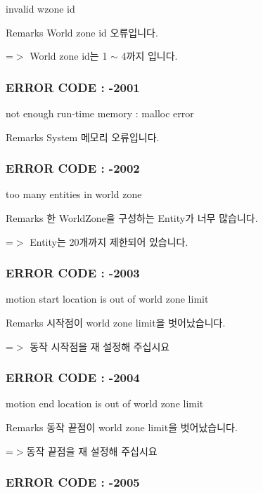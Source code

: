 invalid wzone id \begin{DoxyRemark}{Remarks}
World zone id 오류입니다. \par
 =$>$ World zone id는 1 $\sim$ 4까지 입니다.
\end{DoxyRemark}


 \subsubsection*{E\-R\-R\-O\-R C\-O\-D\-E \-: -\/2001 }

not enough run-\/time memory \-: malloc error \begin{DoxyRemark}{Remarks}
System 메모리 오류입니다.
\end{DoxyRemark}


 \subsubsection*{E\-R\-R\-O\-R C\-O\-D\-E \-: -\/2002 }

too many entities in world zone \begin{DoxyRemark}{Remarks}
한 World\-Zone을 구성하는 Entity가 너무 많습니다. \par
 =$>$ Entity는 20개까지 제한되어 있습니다.
\end{DoxyRemark}


 \subsubsection*{E\-R\-R\-O\-R C\-O\-D\-E \-: -\/2003 }

motion start location is out of world zone limit \begin{DoxyRemark}{Remarks}
시작점이 world zone limit을 벗어났습니다. \par
 =$>$ 동작 시작점을 재 설정해 주십시요
\end{DoxyRemark}


 \subsubsection*{E\-R\-R\-O\-R C\-O\-D\-E \-: -\/2004 }

motion end location is out of world zone limit \begin{DoxyRemark}{Remarks}
동작 끝점이 world zone limit을 벗어났습니다. \par
 =$>$동작 끝점을 재 설정해 주십시요
\end{DoxyRemark}


 \subsubsection*{E\-R\-R\-O\-R C\-O\-D\-E \-: -\/2005 }


